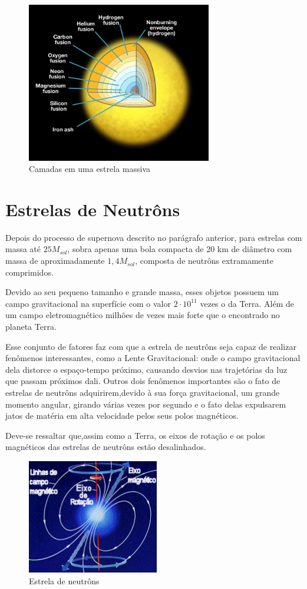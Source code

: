 \documentclass[article,12pt,oneside,a4paper,english,brazil,sumario=tradicional]{abntex2}
\begin{document}
\begin{figure}[h]
	\centering
	\includegraphics[height=7cm]{supernova.jpg}
	\caption{Camadas em uma estrela massiva}
\end{figure}
 
\section{Estrelas de Neutrôns}

Depois do processo de supernova descrito no parágrafo anterior, para estrelas com massa até $25M_{sol}$, sobra apenas uma bola compacta de 20 km de diâmetro com massa de aproximadamente $1,4M_{sol}$, composta de neutrôns extramamente comprimidos.

Devido ao seu pequeno tamanho e grande massa, esses objetos possuem um campo gravitacional na superfície com o valor $2\cdot 10^{11}$ vezes o  da Terra. Além de um campo eletromagnético milhões de vezes mais forte que o encontrado no planeta Terra.

Esse conjunto de fatores faz com que a estrela de neutrôns seja capaz de realizar fenômenos interessantes, como a Lente Gravitacional: onde o campo gravitacional dela distorce o espaço-tempo próximo, causando desvios nas trajetórias da luz que passam próximos dali. Outros dois fenômenos importantes são o fato de estrelas de neutrôns adquirirem,devido à sua força gravitacional, um grande momento angular, girando várias vezes por segundo e  o fato delas expulsarem jatos de matéria em alta velocidade pelos seus polos magnéticos.

Deve-se ressaltar que,assim como a Terra, os eixos de rotação e os polos magnéticos das estrelas de neutrôns estão desalinhados. 

\begin{figure}[h]
	\centering
	\includegraphics[height=5cm]{modelopulsar.png}
	\caption{Estrela de neutrôns}
\end{figure}
\end{document}
